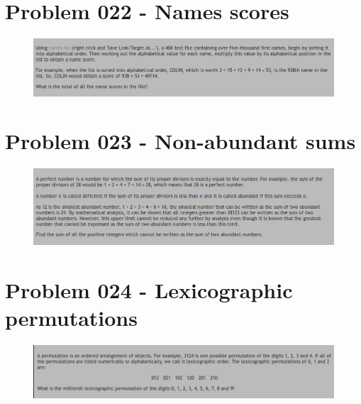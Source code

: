 \section{Problem 022 - Names scores}
\begin{prob}
	\begin{figure}[htb!]
		\begin{center}
			\includegraphics[scale = 0.4]{pic/022.png}
		\end{center}
	\end{figure}
\end{prob}
\begin{sol}

\end{sol}
\section{Problem 023 - Non-abundant sums}
\begin{prob}
	\begin{figure}[htb!]
		\begin{center}
			\includegraphics[scale = 0.4]{pic/023.png}
		\end{center}
	\end{figure}
\end{prob}
\begin{sol}
\end{sol}
\section{Problem 024 - Lexicographic permutations}
\begin{prob}
	\begin{figure}[htb!]
		\begin{center}
			\includegraphics[scale = 0.4]{pic/024.png}
		\end{center}
	\end{figure}
\end{prob}
\begin{sol}
\end{sol}
